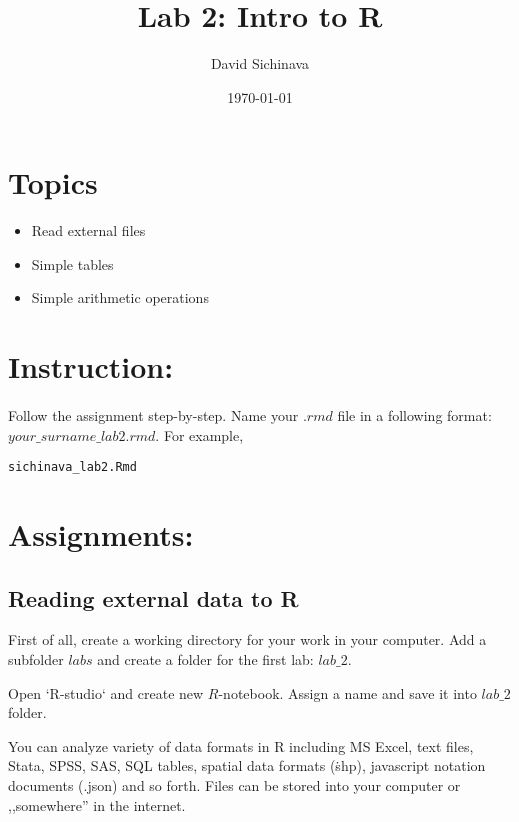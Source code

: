 \documentclass{article}\usepackage[]{graphicx}\usepackage[]{color}
\title{Lab 2: Intro to R}
\author{David Sichinava}
\date{\today}
\makeatletter
\newcommand{\hlstd}[1]{\textcolor[rgb]{0.345,0.345,0.345}{#1}}%
\newenvironment{kframe}{%
 \def\at@end@of@kframe{}%
 \ifinner\ifhmode%
  \def\at@end@of@kframe{\end{minipage}}%
  \begin{minipage}{\columnwidth}%
 \fi\fi%
 \def\FrameCommand##1{\hskip\@totalleftmargin \hskip-\fboxsep
 \colorbox{shadecolor}{##1}\hskip-\fboxsep
     \hskip-\linewidth \hskip-\@totalleftmargin \hskip\columnwidth}%
 \MakeFramed {\advance\hsize-\width
   \@totalleftmargin\z@ \linewidth\hsize
   \@setminipage}}%
 {\par\unskip\endMakeFramed%
 \at@end@of@kframe}
\newenvironment{knitrout}{}{} %
\makeatother
\begin{document}
\maketitle
\section*{Topics}
\begin{itemize}
\item Read external files
\item Simple tables
\item Simple arithmetic operations
\end{itemize}

\section*{Instruction:}

\paragraph{}
Follow the assignment step-by-step. Name your $.rmd$ file in a following format: $your\_surname\_lab2.rmd$. For example,

\begin{knitrout}
\color{fgcolor}\begin{kframe}
\begin{alltt}
\hlstd{sichinava_lab2.Rmd}
\end{alltt}
\end{kframe}
\end{knitrout}

\section*{Assignments:}

\subsection*{Reading external data to R}

First of all, create a working directory for your work in your computer. Add a subfolder $labs$ and create a folder for the first lab: $lab\_2$.

Open `R-studio` and create new $R$-notebook. Assign a name and save it into $lab\_2$ folder. 

You can analyze variety of data formats in R including MS Excel, text files, Stata, SPSS, SAS, SQL tables, spatial data formats (\.shp), javascript notation documents (.json) and so forth. Files can be stored into your computer or ,,somewhere'' in the internet.
\end{document}
